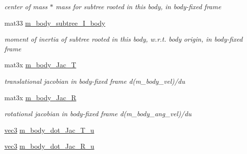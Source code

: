 \begin{CompactItemize}
\begin{CompactList}\small\item\em center of mass $\ast$ mass for subtree rooted in this body, in body-fixed frame \item\end{CompactList}\item 
\hypertarget{structbt_inverse_dynamics_1_1_rigid_body_aae72e24abe3f1abb3d8b6dd3ef18d42}{
mat33 \hyperlink{structbt_inverse_dynamics_1_1_rigid_body_aae72e24abe3f1abb3d8b6dd3ef18d42}{m\_\-body\_\-subtree\_\-I\_\-body}}
\label{structbt_inverse_dynamics_1_1_rigid_body_aae72e24abe3f1abb3d8b6dd3ef18d42}

\begin{CompactList}\small\item\em moment of inertia of subtree rooted in this body, w.r.t. body origin, in body-fixed frame \item\end{CompactList}\item 
\hypertarget{structbt_inverse_dynamics_1_1_rigid_body_dddc2c2b278ffde843dc9771c98741c8}{
mat3x \hyperlink{structbt_inverse_dynamics_1_1_rigid_body_dddc2c2b278ffde843dc9771c98741c8}{m\_\-body\_\-Jac\_\-T}}
\label{structbt_inverse_dynamics_1_1_rigid_body_dddc2c2b278ffde843dc9771c98741c8}

\begin{CompactList}\small\item\em translational jacobian in body-fixed frame d(m\_\-body\_\-vel)/du \item\end{CompactList}\item 
\hypertarget{structbt_inverse_dynamics_1_1_rigid_body_59273d8e09a12a501c36ce482c6bab26}{
mat3x \hyperlink{structbt_inverse_dynamics_1_1_rigid_body_59273d8e09a12a501c36ce482c6bab26}{m\_\-body\_\-Jac\_\-R}}
\label{structbt_inverse_dynamics_1_1_rigid_body_59273d8e09a12a501c36ce482c6bab26}

\begin{CompactList}\small\item\em rotationsl jacobian in body-fixed frame d(m\_\-body\_\-ang\_\-vel)/du \item\end{CompactList}\item 
\hyperlink{classbt_inverse_dynamics_1_1vec3}{vec3} \hyperlink{structbt_inverse_dynamics_1_1_rigid_body_5b544206431b83f7e8f72004add66029}{m\_\-body\_\-dot\_\-Jac\_\-T\_\-u}
\item 
\hyperlink{classbt_inverse_dynamics_1_1vec3}{vec3} \hyperlink{structbt_inverse_dynamics_1_1_rigid_body_aabe7b9e48f3eb97fdfe8f764beb919f}{m\_\-body\_\-dot\_\-Jac\_\-R\_\-u}
\end{CompactItemize}


